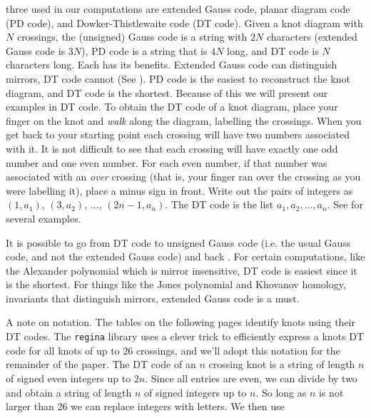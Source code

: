     three used in our computations are extended Gauss code, planar diagram
    code (PD code), and Dowker-Thistlewaite code (DT code). Given a knot
    diagram with $N$ crossings, the (unsigned) Gauss code is a string with $2N$
    characters (extended Gauss code is $3N$),
    PD code is a string that is $4N$ long, and DT code is $N$
    characters long. Each has its benefits. Extended Gauss code
    can distinguish mirrors, DT code cannot
    (See \cite{DOWKER198319}). PD code is the easiest to
    reconstruct the knot diagram, and DT code is the shortest. Because of
    this we will present our examples in DT code. To obtain the DT code of
    a knot diagram, place your finger on the knot and \textit{walk} along
    the diagram, labelling the crossings. When you get back to your starting
    point each crossing will have two numbers associated with it. It is
    not difficult to see that each crossing will have exactly one odd number
    and one even number. For each even number, if that number was associated
    with an \textit{over} crossing (that is, your finger ran over the
    crossing as you were labelling it), place a minus sign in front. Write
    out the pairs of integers as $(1,a_{1})$, $(3,a_{2})$, $\dots$,
    $(2n-1,a_{n})$. The DT code is the list $a_{1},a_{2},\dots,a_{n}$.
    See \cite{KatlasDTCode} for several examples.
    \par\hfill\par
    It is possible to go from DT code to unsigned
    Gauss code (i.e. the usual Gauss code, and not the extended Gauss code)
    and back \cite{KhoHoDTCodes}. For certain computations,
    like the Alexander polynomial which
    is mirror insensitive, DT code is easiest since it is the shortest.
    For things like the Jones polynomial and Khovanov homology, invariants
    that distinguish mirrors, extended Gauss code is a must.
    \par\hfill\par
    A note on notation. The tables on the following pages identify knots using their DT
    codes. The \texttt{regina} library \cite{regina} uses a clever trick to efficiently
    express a knots DT code for all knots of up to 26 crossings, and we'll
    adopt this notation for the remainder of the paper. The DT code of an
    $n$ crossing knot is a string of length $n$ of signed even integers up
    to $2n$. Since all entries are even, we can divide by two and obtain
    a string of length $n$ of signed integers up to $n$. So long as $n$ is
    not larger than 26 we can replace integers with letters. We then use
